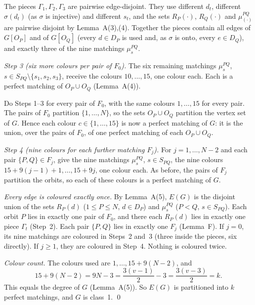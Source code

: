 \documentclass[11pt]{amsart}
\theoremstyle{plain}
\theoremstyle{definition}
\theoremstyle{remark}
\numberwithin{equation}{section}
\begin{document}
The pieces \(\Gamma_1,\Gamma_2,\Gamma_3\) are pairwise edge-disjoint. They use different \(d_t\), different \(\sigma(d_t)\) (as \(\sigma\) is injective) and different \(s_t\), and the sets \(R_P(\cdot)\), \(R_Q(\cdot)\) and \(\mu^{PQ}_{(\cdot)}\) are pairwise disjoint by Lemma~A(3),(4). Together the pieces contain all edges of \(G[O_P]\) and of \(G[O_Q]\) (every \(d\in D_P\) is used and, as \(\sigma\) is onto, every \(e\in D_Q\)), and exactly three of the nine matchings \(\mu^{PQ}_s\).

\emph{Step 3 (six more colours per pair of \(F_0\)).} The six remaining matchings \(\mu^{PQ}_s\), \(s\in S_{PQ}\setminus\{s_1,s_2,s_3\}\), receive the colours \(10,\dots,15\), one colour each. Each is a perfect matching of \(O_P\cup O_Q\) (Lemma~A(4)).

Do Steps 1--3 for every pair of \(F_0\), with the same colours \(1,\dots,15\) for every pair. The pairs of \(F_0\) partition \(\{1,\dots,N\}\), so the sets \(O_P\cup O_Q\) partition the vertex set of \(G\). Hence each colour \(c\in\{1,\dots,15\}\) is now a perfect matching of \(G\): it is the union, over the pairs of \(F_0\), of one perfect matching of each \(O_P\cup O_Q\).

\emph{Step 4 (nine colours for each further matching \(F_j\)).} For \(j=1,\dots,N-2\) and each pair \(\{P,Q\}\in F_j\), give the nine matchings \(\mu^{PQ}_s\), \(s\in S_{PQ}\), the nine colours \(15+9(j-1)+1,\dots,15+9j\), one colour each. As before, the pairs of \(F_j\) partition the orbits, so each of these colours is a perfect matching of \(G\).

\emph{Every edge is coloured exactly once.} By Lemma~A(5), \(E(G)\) is the disjoint union of the sets \(R_P(d)\) (\(1\le P\le N\), \(d\in D_P\)) and \(\mu^{PQ}_s\) (\(P<Q\), \(s\in S_{PQ}\)). Each orbit \(P\) lies in exactly one pair of \(F_0\), and there each \(R_P(d)\) lies in exactly one piece \(\Gamma_t\) (Step~2). Each pair \(\{P,Q\}\) lies in exactly one \(F_j\) (Lemma~F). If \(j=0\), its nine matchings are coloured in Steps~2 and~3 (three inside the pieces, six directly). If \(j\ge1\), they are coloured in Step~4. Nothing is coloured twice.

\emph{Colour count.} The colours used are \(1,\dots,15+9(N-2)\), and
\begin{equation}\label{eq:count}
15+9(N-2)=9N-3=\frac{3(v-1)}{2}-3=\frac{3(v-3)}{2}=k .
\end{equation}
This equals the degree of \(G\) (Lemma~A(5)). So \(E(G)\) is partitioned into \(k\) perfect matchings, and \(G\) is class~1. \qed
\end{document}
